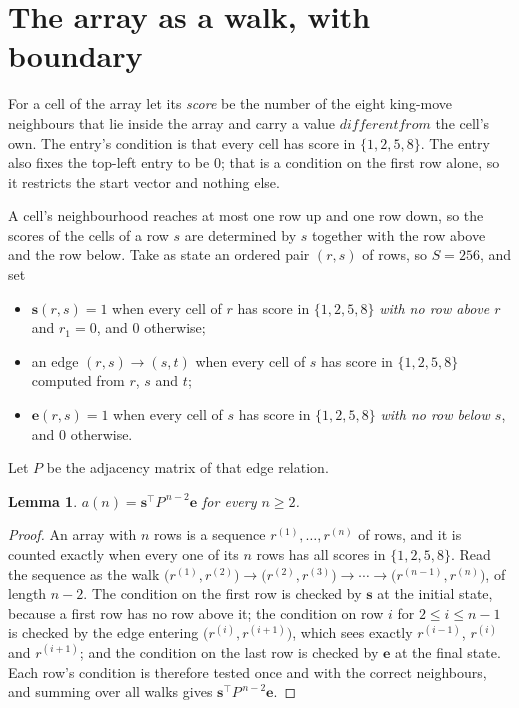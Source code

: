 \documentclass[11pt,a4paper]{article}
\theoremstyle{plain}
\newtheorem{lemma}[theorem]{Lemma}
\theoremstyle{definition}
\begin{document}
\section{The array as a walk, with boundary}

For a cell of the array let its \emph{score} be the number of the eight king-move neighbours that lie inside
the array and carry a value $different from$ the cell's own. The entry's condition is that every cell
has score in $\{1,2,5,8\}$. The entry also fixes the top-left entry to be $0$; that is a condition on the first row alone, so it restricts the start vector and nothing else.

A cell's neighbourhood reaches at most one row up and one row down, so the scores of the
cells of a row $s$ are determined by $s$ together with the row above and the row below.
Take as state an ordered pair $(r,s)$ of rows, so $S=256$, and set
\begin{itemize}
\item $\mathbf{s}(r,s)=1$ when every cell of $r$ has score in $\{1,2,5,8\}$ \emph{with no row
above $r$} and $r_1=0$, and $0$ otherwise;
\item an edge $(r,s)\to(s,t)$ when every cell of $s$ has score in $\{1,2,5,8\}$ computed from
$r$, $s$ and $t$;
\item $\mathbf{e}(r,s)=1$ when every cell of $s$ has score in $\{1,2,5,8\}$ \emph{with no row
below $s$}, and $0$ otherwise.
\end{itemize}
Let $P$ be the adjacency matrix of that edge relation.

\begin{lemma}\label{lem:walk}
$a(n)=\mathbf{s}^{\!\top}P^{\,n-2}\mathbf{e}$ for every $n\ge2$.
\end{lemma}

\begin{proof}
An array with $n$ rows is a sequence $r^{(1)},\dots,r^{(n)}$ of rows, and it is counted
exactly when every one of its $n$ rows has all scores in $\{1,2,5,8\}$. Read the sequence as the
walk $\bigl(r^{(1)},r^{(2)}\bigr)\to\bigl(r^{(2)},r^{(3)}\bigr)\to\cdots\to
\bigl(r^{(n-1)},r^{(n)}\bigr)$, of length $n-2$. The condition on the first row is
checked by $\mathbf{s}$ at the initial state, because a first row has no row above it; the
condition on row $i$ for $2\le i\le n-1$ is checked by the edge entering
$\bigl(r^{(i)},r^{(i+1)}\bigr)$, which sees exactly $r^{(i-1)}$, $r^{(i)}$ and
$r^{(i+1)}$; and the condition on the last row is checked by $\mathbf{e}$ at the final
state. Each row's condition is therefore tested once and with the correct neighbours, and
summing over all walks gives $\mathbf{s}^{\!\top}P^{\,n-2}\mathbf{e}$.
\end{proof}
\end{document}
